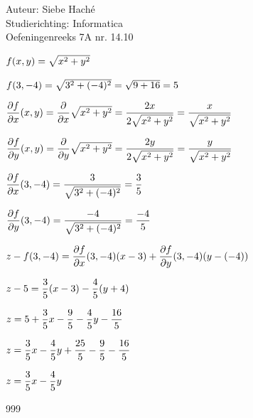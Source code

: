 \documentclass[a4paper]{article}
\begin{document}
\noindent \large Auteur: Siebe Haché \\
\noindent \large Studierichting: Informatica \\
\noindent \large Oefeningenreeks 7A nr. 14.10\\

\medskip
\normalsize

$f(x,y) = \sqrt{x^2 + y^2} \\$

$f(3,-4) = \sqrt{3^2 + (-4)^2} = \sqrt{9 + 16} = 5 \\$

$\dfrac{\partial f}{\partial x}(x,y) = \dfrac{\partial}{\partial x} \sqrt{x^2 + y^2} = \dfrac{2x}{2\sqrt{x^2 + y^2}} = \dfrac{x}{\sqrt{x^2 + y^2}} \\$

$\dfrac{\partial f}{\partial y}(x,y) = \dfrac{\partial}{\partial y} \sqrt{x^2 + y^2} = \dfrac{2y}{2\sqrt{x^2 + y^2}} = \dfrac{y}{\sqrt{x^2 + y^2}} \\$

$\dfrac{\partial f}{\partial x}(3,-4) = \dfrac{3}{\sqrt{3^2 + (-4)^2}} = \dfrac{3}{5} \\$

$\dfrac{\partial f}{\partial y}(3,-4) = \dfrac{-4}{\sqrt{3^2 + (-4)^2}} = \dfrac{-4}{5} \\$

$z - f(3,-4) = \dfrac{\partial f}{\partial x}(3,-4)(x - 3) + \dfrac{\partial f}{\partial y}(3,-4)(y - (-4)) \\$

$z - 5 = \dfrac{3}{5}(x - 3) - \dfrac{4}{5}(y + 4) \\$

$z = 5 + \dfrac{3}{5}x - \dfrac{9}{5} - \dfrac{4}{5}y - \dfrac{16}{5} \\$

$z = \dfrac{3}{5}x - \dfrac{4}{5}y + \dfrac{25}{5} - \dfrac{9}{5} - \dfrac{16}{5} \\$

$z = \dfrac{3}{5}x - \dfrac{4}{5}y \\$

\begin{thebibliography}{999}
\end{thebibliography}
\end{document}

